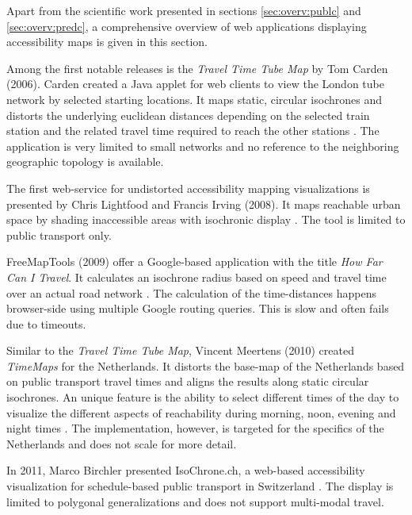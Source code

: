     Apart from the scientific work presented in sections \ref{sec:overv:publc}
    and \ref{sec:overv:predc}, a comprehensive overview of web applications
    displaying accessibility maps is given in this section.\par

    Among the first notable releases is the \textit{Travel Time Tube Map} by Tom
    Carden (2006). Carden created a Java applet for web clients to view the
    London tube network by selected starting locations. It maps static, circular
    isochrones and distorts the underlying euclidean distances depending on the
    selected train station and the related travel time required to reach the
    other stations \cite{Carden2006}. The application is very limited to small
    networks and no reference to the neighboring geographic topology is
    available.\par

    The first web-service for undistorted accessibility mapping visualizations
    is presented by Chris Lightfood and Francis Irving (2008)\cite{Mapumental}.
    It maps reachable urban space by shading inaccessible areas with isochronic
    display \cite{Lightfoot2006,Irving2007}. The tool is limited to public
    transport only.\par

    FreeMapTools (2009) offer a Google-based application with the title
    \textit{How Far Can I Travel}. It calculates an isochrone radius based on
    speed and travel time over an actual road network \cite{Freemaptools}. The
    calculation of the time-distances happens browser-side using multiple Google
    routing queries. This is slow and often fails due to timeouts.\par

    Similar to the \textit{Travel Time Tube Map}, Vincent Meertens (2010)
    created \textit{TimeMaps} for the Netherlands. It distorts the base-map of
    the Netherlands based on public transport travel times and aligns the
    results along static circular isochrones. An unique feature is the ability
    to select different times of the day to visualize the different aspects of
    reachability during morning, noon, evening and night times
    \cite{TimeMaps,meertens2012}. The implementation, however, is targeted for
    the specifics of the Netherlands and does not scale for more detail.\par

    In 2011, Marco Birchler presented IsoChrone.ch, a web-based accessibility
    visualization for schedule-based public transport in Switzerland
    \cite{IsochroneCh,birchler2011computing}. The display is limited to
    polygonal generalizations and does not support multi-modal travel.\par

